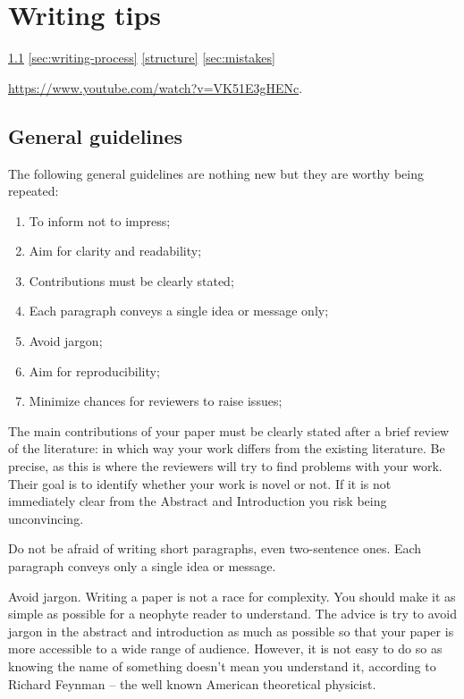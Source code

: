 \documentclass[authoryear,3p,times,preprint,review,fleqn]{elsarticle}
\numberwithin{equation}{section}
\theoremstyle{remark}
\begin{document}
\section{Writing tips}\label{sec:writing-tips}

\cref{sec:guidelines}
\cref{sec:writing-process}
\cref{structure}
\cref{sec:mistakes}

\url{https://www.youtube.com/watch?v=VK51E3gHENc}.

\subsection{General guidelines}\label{sec:guidelines}

The following general guidelines are nothing new but they are worthy being repeated:

\begin{enumerate}
\item To inform not to impress;
\item Aim for clarity and readability;
\item Contributions must be clearly stated;
\item Each paragraph conveys a single idea or message only;
\item Avoid jargon;%
\item Aim for reproducibility;
\item Minimize chances for reviewers to raise issues;
\end{enumerate}

The main contributions of your paper must be clearly stated after a brief review of the literature: in which way your work differs from the existing literature. Be precise, as this is where the reviewers will try to find problems with your work. Their goal is to identify whether your work is novel or not. If it is not immediately clear from the Abstract and Introduction you risk being unconvincing. 

Do not be afraid of writing short paragraphs, even two-sentence ones. Each paragraph conveys only a single idea or message.

Avoid jargon.  Writing a paper is not a race for complexity. You should make it as simple as possible for a neophyte reader to understand.
The advice is try to avoid jargon in the abstract and introduction as much as possible so that your paper is more accessible to a wide range of audience. However, it is not easy to do so as knowing the name of something doesn’t mean you understand it, according to Richard Feynman -- the well known American theoretical physicist.
\end{document}
